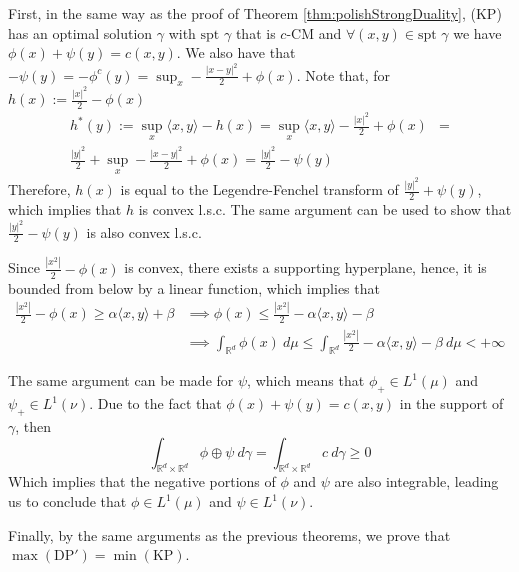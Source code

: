\begin{prf}
  First, in the same way as the proof of Theorem \ref{thm:polishStrongDuality}, (KP) has an optimal solution $\gamma$
  with $\text{spt }\gamma$ that is $c$-CM and $ \forall (x,y) \in \text{spt } \gamma$ we have $\phi(x)+ \psi(y) = c(x,y)$.
  We also have that $-\psi(y)=-\phi^c(y)=\sup_x - \frac{|x-y|^2}{2} + \phi(x)$.
  Note that, for $h(x) := \frac{|x|^2}{2} -\phi(x)$
  \begin{align*}
    h^*(y):=\sup_x \langle x,y \rangle - h(x) =
    \sup_x \langle x,y \rangle - \frac{|x|^2}{2}  + \phi(x) &= \\
    \frac{|y|^2}{2} + \sup_x -\frac{|x-y|^2}{2} + \phi(x) = \frac{|y|^2}{2} - \psi(y)
  \end{align*}
  Therefore, $h(x)$ is equal to the Legendre-Fenchel transform of
  $\frac{|y|^2}{2} + \psi(y)$, which implies that $h$ is convex l.s.c. The same argument can be used
  to show that $\frac{|y|^2}{2} - \psi(y)$ is also convex l.s.c.

  Since $\frac{|x^2|}{2} - \phi(x)$ is convex, there exists a supporting hyperplane, hence, it
  is bounded from below by a linear function, which implies that
  \begin{align*}
    \frac{|x^2|}{2} - \phi(x) \geq \alpha \langle x,y \rangle  + \beta & \implies
    \phi(x) \leq \frac{|x^2|}{2} - \alpha \langle x,y \rangle - \beta             \\
                                                                       & \implies
    \int_{\mathbb R^d} \phi(x) \ d\mu \leq \int_{\mathbb R^d} \frac{|x^2|}{2} - \alpha \langle x,y \rangle - \beta \ d\mu < +\infty
  \end{align*}

  The same argument can be made for $\psi$, which means that $\phi_+ \in  L^1(\mu)$ and $\psi_+ \in L^1(\nu)$.
  Due to the fact that $\phi(x) + \psi(y) = c(x,y)$ in the support of $\gamma$, then
  \begin{equation*}
    \int_{\mathbb R^d \times \mathbb R^d} \phi \oplus \psi \ d\gamma  =
    \int_{\mathbb R^d \times \mathbb R^d} c \ d\gamma  \geq 0
  \end{equation*}
  Which implies that the negative portions of $\phi$ and $\psi$ are also integrable, leading us to conclude
  that $\phi \in L^1(\mu)$ and $\psi \in L^1(\nu)$.

  Finally, by the same arguments as the previous theorems, we prove that
  $\mathrm{\max(DP')}= \mathrm{\min(KP)}$.

\end{prf}


